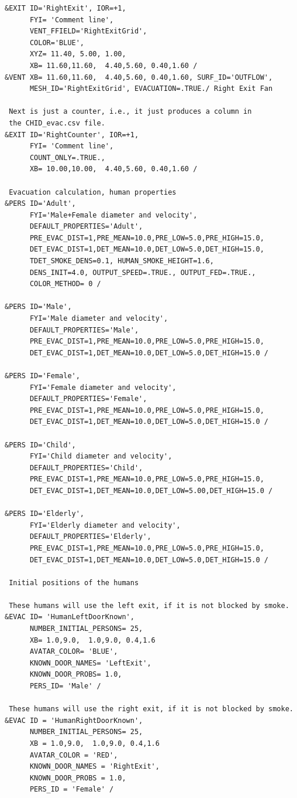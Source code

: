 \documentclass[12pt,a4paper,final,twoside]{stylevk}
\begin{document}
{\begin{verbatim}
&EXIT ID='RightExit', IOR=+1,
      FYI= 'Comment line',
      VENT_FFIELD='RightExitGrid',
      COLOR='BLUE',
      XYZ= 11.40, 5.00, 1.00,
      XB= 11.60,11.60,  4.40,5.60, 0.40,1.60 /
&VENT XB= 11.60,11.60,  4.40,5.60, 0.40,1.60, SURF_ID='OUTFLOW', 
      MESH_ID='RightExitGrid', EVACUATION=.TRUE./ Right Exit Fan

 Next is just a counter, i.e., it just produces a column in
 the CHID_evac.csv file.
&EXIT ID='RightCounter', IOR=+1,
      FYI= 'Comment line',
      COUNT_ONLY=.TRUE.,
      XB= 10.00,10.00,  4.40,5.60, 0.40,1.60 /

 Evacuation calculation, human properties
&PERS ID='Adult',
      FYI='Male+Female diameter and velocity',
      DEFAULT_PROPERTIES='Adult',
      PRE_EVAC_DIST=1,PRE_MEAN=10.0,PRE_LOW=5.0,PRE_HIGH=15.0,
      DET_EVAC_DIST=1,DET_MEAN=10.0,DET_LOW=5.0,DET_HIGH=15.0,
      TDET_SMOKE_DENS=0.1, HUMAN_SMOKE_HEIGHT=1.6,
      DENS_INIT=4.0, OUTPUT_SPEED=.TRUE., OUTPUT_FED=.TRUE.,
      COLOR_METHOD= 0 /

&PERS ID='Male',
      FYI='Male diameter and velocity',
      DEFAULT_PROPERTIES='Male',
      PRE_EVAC_DIST=1,PRE_MEAN=10.0,PRE_LOW=5.0,PRE_HIGH=15.0,
      DET_EVAC_DIST=1,DET_MEAN=10.0,DET_LOW=5.0,DET_HIGH=15.0 /

&PERS ID='Female',
      FYI='Female diameter and velocity',
      DEFAULT_PROPERTIES='Female',
      PRE_EVAC_DIST=1,PRE_MEAN=10.0,PRE_LOW=5.0,PRE_HIGH=15.0,
      DET_EVAC_DIST=1,DET_MEAN=10.0,DET_LOW=5.0,DET_HIGH=15.0 /

&PERS ID='Child',
      FYI='Child diameter and velocity',
      DEFAULT_PROPERTIES='Child',
      PRE_EVAC_DIST=1,PRE_MEAN=10.0,PRE_LOW=5.0,PRE_HIGH=15.0,
      DET_EVAC_DIST=1,DET_MEAN=10.0,DET_LOW=5.00,DET_HIGH=15.0 /

&PERS ID='Elderly',
      FYI='Elderly diameter and velocity',
      DEFAULT_PROPERTIES='Elderly',
      PRE_EVAC_DIST=1,PRE_MEAN=10.0,PRE_LOW=5.0,PRE_HIGH=15.0,
      DET_EVAC_DIST=1,DET_MEAN=10.0,DET_LOW=5.0,DET_HIGH=15.0 /

 Initial positions of the humans

 These humans will use the left exit, if it is not blocked by smoke.
&EVAC ID= 'HumanLeftDoorKnown', 
      NUMBER_INITIAL_PERSONS= 25,
      XB= 1.0,9.0,  1.0,9.0, 0.4,1.6
      AVATAR_COLOR= 'BLUE',
      KNOWN_DOOR_NAMES= 'LeftExit',
      KNOWN_DOOR_PROBS= 1.0,
      PERS_ID= 'Male' / 

 These humans will use the right exit, if it is not blocked by smoke.
&EVAC ID = 'HumanRightDoorKnown', 
      NUMBER_INITIAL_PERSONS= 25,
      XB = 1.0,9.0,  1.0,9.0, 0.4,1.6
      AVATAR_COLOR = 'RED',
      KNOWN_DOOR_NAMES = 'RightExit',
      KNOWN_DOOR_PROBS = 1.0,
      PERS_ID = 'Female' / 


\end{verbatim}}
\end{document}
